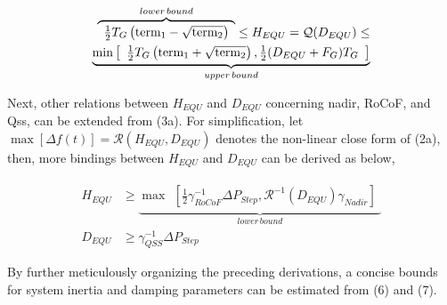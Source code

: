 \documentclass[lettersize,journal]{IEEEtran}
\begin{document}
\vspace{-0.25cm}
\begin{subequations}
  \begin{align}
    \overbrace{\begin{array}{l}\frac{1}{2}T_G \left(\text{term}_1 - \sqrt{\text{term}_2} \right)\end{array}}^{lower\,bound} \leq H_{EQU}=\mathcal{Q} (D_{EQU}) \leq \notag \\
    \underbrace{\min \left [
    \begin{array}{l}
      \frac{1}{2}T_G \left(\text{term}_1 + \sqrt{\text{term}_2}\right), \frac{1}{2} (D_{EQU} + F_G) T_{G}\\
    \end{array} \right ]
    }_{upper\, bound}
    \end{align}
  \end{subequations}

Next, other relations between $H_{EQU}$ and $D_{EQU}$ concerning nadir, RoCoF, and Qss, can be extended from (3a). For simplification, let $\max [ \varDelta f(t)]=\mathcal{R} (H_{EQU}, D_{EQU})$ denotes the non-linear close form of (2a), then, more bindings between $H_{EQU}$ and $D_{EQU}$ can be derived as below,

\vspace{-0.25cm}
\begin{subequations}
  \begin{align}
H_{EQU} &\!\geq\! \underbrace{\max\!\!\! \begin{array}{l}[\frac{1}{2} \gamma_{RoCoF}^{-1} \varDelta P_{Step},\mathcal{R}^{-1}(D_{EQU}) \gamma_{Nadir}]\end{array}}_{lower\, bound} \\
D_{EQU} & \geq \gamma_{QSS}^{-1} \varDelta P_{Step}
  \end{align}
\end{subequations}

By further meticulously organizing the preceding derivations, a concise bounds for system inertia and damping parameters can be estimated from (6) and (7).
\end{document}
